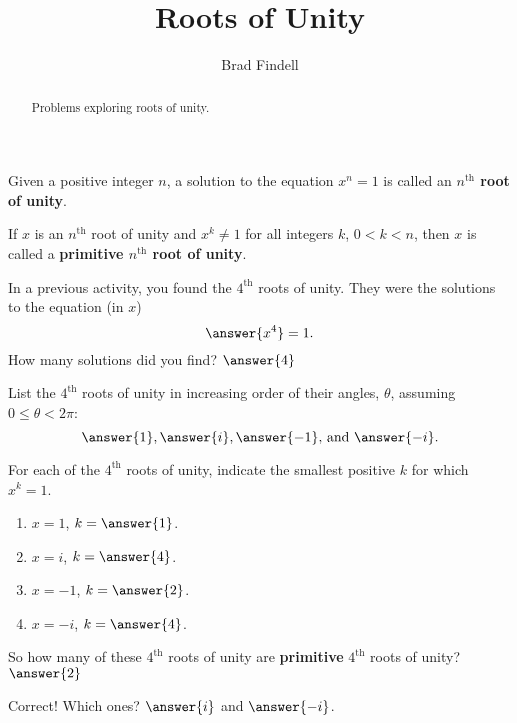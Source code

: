 \documentclass[space,nooutcomes]{ximera}
\title{Roots of Unity}
\author{Brad Findell}
\begin{document}
\begin{abstract}
Problems exploring roots of unity.   
\end{abstract}
\maketitle


\begin{definition}
Given a positive integer $n$, a solution to the equation $x^n=1$ is called an \textbf{$n^\text{th}$  root of unity}.    

If $x$ is an $n^\text{th}$ root of unity and $x^k\ne 1$ for all integers $k$, $0<k<n$, then $x$ is called a \textbf{primitive $n^\text{th}$ root of unity}.
\end{definition}
 
\begin{problem}
In a previous activity, you found the $4^\text{th}$ roots of unity.  They were the solutions to the equation (in $x$)
\[
\answer{x^4} = 1.  
\]
How many solutions did you find?  $\answer{4}$
\begin{problem}
List the $4^\text{th}$ roots of unity in increasing order of their angles, $\theta$, assuming $0\le \theta<2\pi$: 
\[
\answer{1}, \answer{i}, \answer{-1}\text{, and }\answer{-i}. 
\]
\begin{problem}
For each of the $4^\text{th}$ roots of unity, indicate the smallest positive $k$ for which $x^k = 1$.  
\begin{enumerate}
\item $x=1$, $k=\answer{1}$.  
\item $x=i$, $k=\answer{4}$.
\item $x=-1$, $k=\answer{2}$.  
\item $x=-i$, $k=\answer{4}$.
\end{enumerate}
So how many of these $4^\text{th}$ roots of unity are \textbf{primitive} $4^\text{th}$ roots of unity?  
$\answer{2}$
\begin{problem}
Correct!  Which ones?  $\answer{i}$ and $\answer{-i}$.  
\end{problem}
\end{problem}
\end{problem}
\end{problem}
\end{document}
